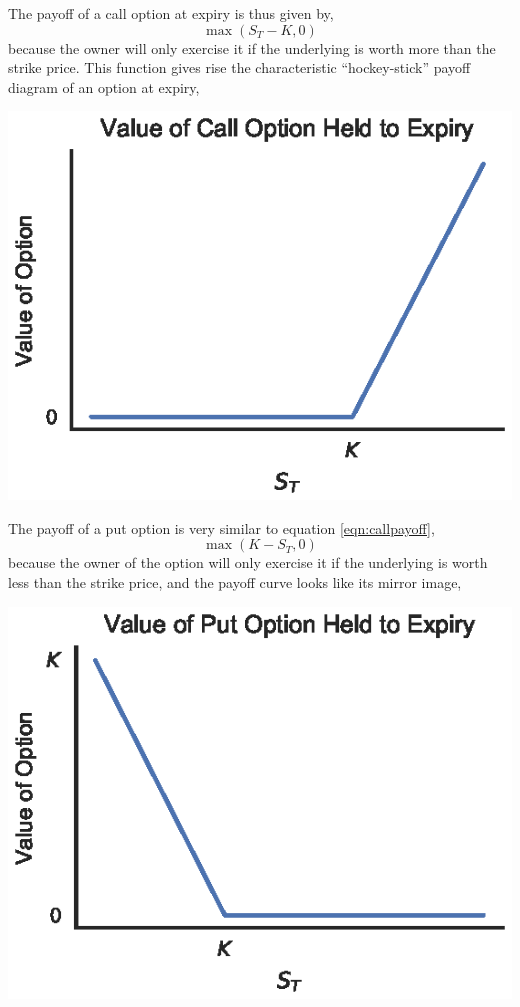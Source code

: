 \documentclass[12pt]{article}
\numberwithin{equation}{section}
\begin{document}
The payoff of a call option at expiry is thus given by,
\begin{equation}
 \max(S_T - K, 0) 
\label{eqn:callpayoff}
\end{equation}
because the owner will only exercise it if the underlying is worth more than the
strike price. This function gives rise the characteristic ``hockey-stick''
payoff diagram of an option at expiry,

\begin{center}
\includegraphics{figs/calloptpayoff}
\end{center}

The payoff of a put option is very similar to equation \ref{eqn:callpayoff},
\begin{equation}
 \max(K-S_T, 0) 
\end{equation}
because the owner of the option will only exercise it if the underlying is worth
less than the strike price, 
and the payoff curve looks like its mirror image,

\begin{center}
\includegraphics{figs/putoptpayoff}
\end{center}
\end{document}
